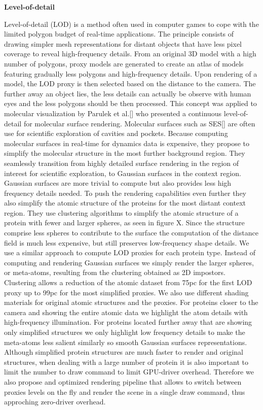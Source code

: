 \textbf{Level-of-detail}

Level-of-detail (LOD) is a method often used in computer games to cope with the limited polygon budget of real-time applications.
The principle consists of drawing simpler mesh representations for distant objects that have less pixel coverage to reveal high-frequency details. 
From an original 3D model with a high number of polygons, proxy models are generated to create an atlas of models featuring gradually less polygons and high-frequency details.
Upon rendering of a model, the LOD proxy is then selected based on the distance to the camera.
The further away an object lies, the less details can actually be observe with human eyes and the less polygons should be then processed.
This concept was applied to molecular visualization by Parulek et al.[] who presented a continuous level-of-detail for molecular surface rendering.
Molecular surfaces such as SES[] are often use for scientific exploration of cavities and pockets.
Because computing molecular surfaces in real-time for dynamics data is expensive, they propose to simplify the molecular structure in the most further background region.
They seamlessly transition from highly detailed surface rendering in the region of interest for scientific exploration, to Gaussian surfaces in the context region.
Gaussian surfaces are more trivial to compute but also provides less high frequency details needed.
To push the rendering capabilities even further they also simplify the atomic structure of the proteins for the most distant context region.
They use clustering algorithms to simplify the atomic structure of a protein with fewer and larger spheres, as seen in figure X.
Since the structure comprise less spheres to contribute to the surface the computation of the distance field is much less expensive, but still preserves low-frequency shape details.
We use a similar approach to compute LOD proxies for each protein type. 
Instead of computing and rendering Gaussian surfaces we simply render the larger spheres, or meta-atoms, resulting from the clustering obtained as 2D impostors.
Clustering allows a reduction of the atomic dataset from 75pc for the first LOD proxy up to 99pc for the most simplified proxies.
We also use different shading materials for original atomic structures and the proxies.
For proteins closer to the camera and showing the entire atomic data we highlight the atom details with high-frequency illumination.
For proteins located further away that are showing only simplified structures we only highlight low frequency details to make the meta-atoms less salient similarly so smooth Gaussian surfaces representations.
Although simplified protein structures are much faster to render and original structures, when dealing with a large number of protein it is also important to limit the number to draw command to limit GPU-driver overhead.
Therefore we also propose and optimized rendering pipeline that allows to switch between proxies levels on the fly and render the scene in a single draw command, thus approching zero-driver overhead.

